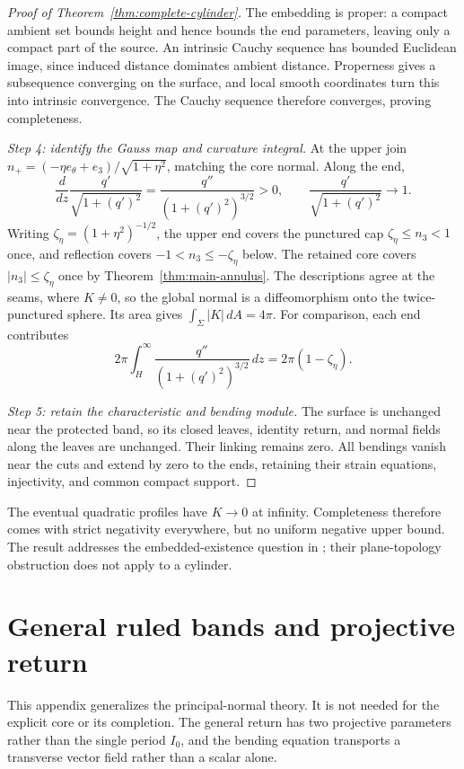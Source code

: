 \documentclass[11pt]{amsart}
\theoremstyle{definition}
\theoremstyle{remark}
\numberwithin{equation}{section}
\begin{document}
\begin{proof}[Proof of Theorem~\ref{thm:complete-cylinder}]
The embedding is proper: a compact ambient set bounds height and hence
bounds the end parameters, leaving only a compact part of the source.
An intrinsic Cauchy sequence has bounded Euclidean image, since induced
distance dominates ambient distance. Properness gives a subsequence
converging on the surface, and local smooth coordinates turn this into
intrinsic convergence. The Cauchy sequence therefore converges, proving
completeness.

\emph{Step 4: identify the Gauss map and curvature integral.}
At the upper join $n_+=(-\eta e_\theta+e_3)/\sqrt{1+\eta^2}$,
matching the core normal. Along the end,
\[
 \frac d{dz}\frac{q'}{\sqrt{1+(q')^2}}
 =\frac{q''}{(1+(q')^2)^{3/2}}>0,
 \qquad\frac{q'}{\sqrt{1+(q')^2}}\longrightarrow1.
\]
Writing $\zeta_\eta=(1+\eta^2)^{-1/2}$, the upper end covers the
punctured cap $\zeta_\eta\le n_3<1$ once, and reflection covers
$-1<n_3\le-\zeta_\eta$ below. The retained core covers
$|n_3|\le\zeta_\eta$ once by
Theorem~\ref{thm:main-annulus}. The descriptions agree at the seams,
where $K\ne0$, so the global normal is a diffeomorphism onto the
twice-punctured sphere. Its area gives $\int_\Sigma|K|\,dA=4\pi$.
For comparison, each end contributes
\[
 2\pi\int_H^\infty\frac{q''}{(1+(q')^2)^{3/2}}\,dz
 =2\pi(1-\zeta_\eta).
\]

\emph{Step 5: retain the characteristic and bending module.}
The surface is unchanged near the protected band, so its closed leaves,
identity return, and normal fields along the leaves are unchanged.
Their linking remains zero. All bendings vanish near the cuts and extend
by zero to the ends, retaining their strain equations, injectivity, and
common compact support.
\end{proof}
The eventual quadratic profiles have $K\to0$ at infinity. Completeness
therefore comes with strict negativity everywhere, but no uniform negative
upper bound. The result addresses the embedded-existence question in
\cite[after Theorem~3.4]{NiZhangZhang}; their plane-topology obstruction
does not apply to a cylinder.

\appendix
\section{General ruled bands and projective return}\label{sec:general-ruled}
This appendix generalizes the principal-normal theory. It is not needed
for the explicit core or its completion. The general return has two
projective parameters rather than the single period $I_0$, and the bending
equation transports a transverse vector field rather than a scalar alone.
\end{document}
